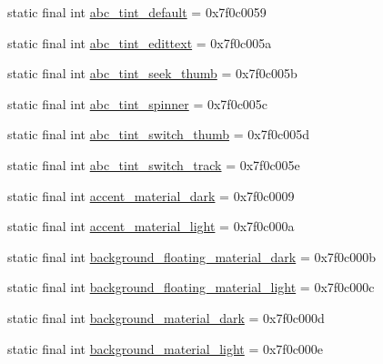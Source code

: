 \begin{CompactItemize}
\item 
static final int \hyperlink{classandroid_1_1support_1_1graphics_1_1drawable_1_1animated_1_1_r_1_1color_fda828aac092a4fd68dca2049a632029}{abc\_\-tint\_\-default} = 0x7f0c0059
\item 
static final int \hyperlink{classandroid_1_1support_1_1graphics_1_1drawable_1_1animated_1_1_r_1_1color_a8d83abc74754b8cd860cd82eff9ec1d}{abc\_\-tint\_\-edittext} = 0x7f0c005a
\item 
static final int \hyperlink{classandroid_1_1support_1_1graphics_1_1drawable_1_1animated_1_1_r_1_1color_f983bc75e068757ea68f997ebb33c0d0}{abc\_\-tint\_\-seek\_\-thumb} = 0x7f0c005b
\item 
static final int \hyperlink{classandroid_1_1support_1_1graphics_1_1drawable_1_1animated_1_1_r_1_1color_2c0c064a7de714438f65145488b733d0}{abc\_\-tint\_\-spinner} = 0x7f0c005c
\item 
static final int \hyperlink{classandroid_1_1support_1_1graphics_1_1drawable_1_1animated_1_1_r_1_1color_7e97b3e7bfe02d4091546b82b5b37e12}{abc\_\-tint\_\-switch\_\-thumb} = 0x7f0c005d
\item 
static final int \hyperlink{classandroid_1_1support_1_1graphics_1_1drawable_1_1animated_1_1_r_1_1color_4248b40cb0a41b963837240e457ea1f5}{abc\_\-tint\_\-switch\_\-track} = 0x7f0c005e
\item 
static final int \hyperlink{classandroid_1_1support_1_1graphics_1_1drawable_1_1animated_1_1_r_1_1color_78a18db895473b5c6e44e5bd5aadadc2}{accent\_\-material\_\-dark} = 0x7f0c0009
\item 
static final int \hyperlink{classandroid_1_1support_1_1graphics_1_1drawable_1_1animated_1_1_r_1_1color_b294aec6308807f91a41d35de6708a23}{accent\_\-material\_\-light} = 0x7f0c000a
\item 
static final int \hyperlink{classandroid_1_1support_1_1graphics_1_1drawable_1_1animated_1_1_r_1_1color_21d4538ec7e149364f7cb1384ca52c23}{background\_\-floating\_\-material\_\-dark} = 0x7f0c000b
\item 
static final int \hyperlink{classandroid_1_1support_1_1graphics_1_1drawable_1_1animated_1_1_r_1_1color_dc40134f2d52341615c98d128209a60a}{background\_\-floating\_\-material\_\-light} = 0x7f0c000c
\item 
static final int \hyperlink{classandroid_1_1support_1_1graphics_1_1drawable_1_1animated_1_1_r_1_1color_562bfc40531cb62066bb94694d3c8588}{background\_\-material\_\-dark} = 0x7f0c000d
\item 
static final int \hyperlink{classandroid_1_1support_1_1graphics_1_1drawable_1_1animated_1_1_r_1_1color_71439232924c1e1925844d691a8ac31e}{background\_\-material\_\-light} = 0x7f0c000e

\end{CompactItemize}
